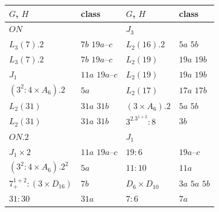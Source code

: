 \documentclass{article}
\theoremstyle{remark}
\theoremstyle{definition}
\begin{document}
\begin{table}[h]
\centering

\begin{tabular}{|l | l || l|l| }  \hline \underline{$G$}, $H$ & class & \underline{$G$}, $H$  & class \\
\hline \hline
\underline{$ON$}                &                           & \underline{$J_3$}               &  \\
$L_3(7).2$                      & $7b$ $19a$--$c$    & $L_2(16).2$                     & $5a$ $5b$  \\
$L_3(7).2$                          & $7b$ $19a$--$c$    & $L_2(19)$                       & $19a$ $19b$  \\
$J_1$                           & $11a$ $19a$--$c$   & $L_2(19)$                          & $19a$ $19b$  \\
$(3^2:4 \times A_6).2$                          & $5a$                      & $L_2(17)$                       & $17a$ $17b$  \\
$L_2(31)$                       & $31a$ $31b$               & $(3 \times A_6).2$                          & $5a$ $5b$  \\
$L_2(31)$                          & $31a$ $31b$               & $3^2.3^{1+2}:8$                 & $3b$  \\ \hline

\underline{$ON.2$}              &                           & \underline{$J_1$}             &  \\
$J_1\times 2 $                  & $11a$ $19a$--$c$   & $19:6$                        & $19a$--$c$  \\
$(3^2:4\times A_6).2^2$         & $5a$                      & $11:10$                       & $11a$  \\
$7^{1+2}_+:(3\times D_{16})$    & $7b$                      & $D_6\times D_{10}$            & $3a$ $5a$ $5b$   \\
$31:30$                         & $31a$                     & $7:6$                         & $7a$  \\ \hline


\end{tabular}
\end{table}
\end{document}
